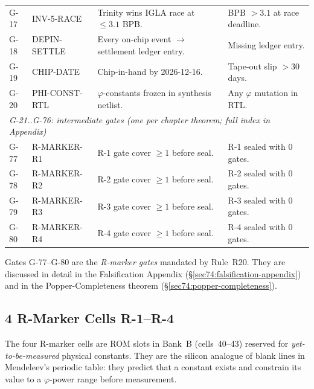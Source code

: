\begin{table}[H]
\begin{tabular}{llp{4.5cm}p{3.5cm}}
G-17 & INV-5-RACE    & Trinity wins IGLA race at $\leq 3.1$ BPB.        & BPB $> 3.1$ at race deadline. \\
G-18 & DEPIN-SETTLE  & Every on-chip event $\to$ settlement ledger entry. & Missing ledger entry. \\
G-19 & CHIP-DATE     & Chip-in-hand by 2026-12-16.                      & Tape-out slip $> 30$ days. \\
G-20 & PHI-CONST-RTL & $\varphi$-constants frozen in synthesis netlist.  & Any $\varphi$ mutation in RTL. \\
\midrule
\multicolumn{4}{l}{\textit{G-21..G-76: intermediate gates (one per chapter theorem; full index in Appendix)}} \\
G-77 & R-MARKER-R1   & R-1 gate cover $\geq 1$ before seal.             & R-1 sealed with 0 gates. \\
G-78 & R-MARKER-R2   & R-2 gate cover $\geq 1$ before seal.             & R-2 sealed with 0 gates. \\
G-79 & R-MARKER-R3   & R-3 gate cover $\geq 1$ before seal.             & R-3 sealed with 0 gates. \\
G-80 & R-MARKER-R4   & R-4 gate cover $\geq 1$ before seal.             & R-4 sealed with 0 gates. \\
\bottomrule
\end{tabular}
\end{table}

\begin{remark}
Gates G-77--G-80 are the \emph{R-marker gates} mandated by
Rule~R20.  They are discussed in detail in the Falsification Appendix
(\S\ref{sec74:falsification-appendix}) and in the Popper-Completeness
theorem (\S\ref{sec74:popper-completeness}).
\end{remark}

\subsection{4 R-Marker Cells R-1--R-4}
\label{sec74:r-markers}

The four R-marker cells are ROM slots in Bank~B (cells~40--43) reserved
for \emph{yet-to-be-measured} physical constants.  They are the
silicon analogue of blank lines in Mendeleev's periodic table: they
predict that a constant exists and constrain its value to a
$\varphi$-power range before measurement.

